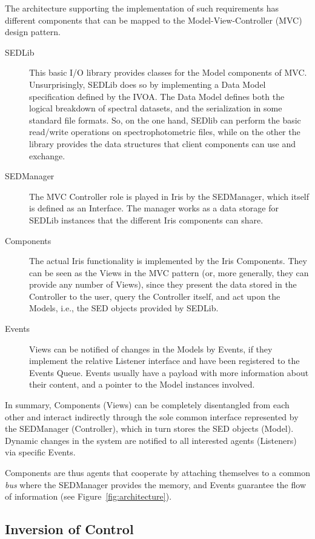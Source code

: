 \documentclass[final,5p,authoryear]{elsarticle}
\begin{document}
The architecture supporting the implementation of such requirements has
different components that can be mapped to the Model-View-Controller (MVC)
design pattern.
\begin{description}
\item[SEDLib] This basic I/O library provides
classes for the Model components of MVC. Unsurprisingly, SEDLib does so by
implementing a Data Model specification defined by the IVOA. The Data Model
defines both the logical breakdown of spectral datasets, and the serialization
in some standard file formats. So, on the one hand, SEDlib can perform the basic
read/write operations on spectrophotometric files, while on the other the library
provides the data structures that client components can use and exchange.
\item[SEDManager] The MVC Controller role is played in Iris by the SEDManager,
which itself is defined as an Interface. The manager works as a data storage for
SEDLib instances that the different Iris components can share.
\item[Components] The actual Iris functionality is implemented by the Iris
Components. They can be seen as the Views in the MVC pattern (or, more
generally, they can provide any number of Views), since they present the data
stored in the Controller to the user, query the Controller itself, and act upon
the Models, i.e., the SED objects provided by SEDLib. 
\item[Events] Views can be
notified of changes in the Models by Events, if they implement the relative
Listener interface and have been registered to the Events Queue. Events usually
have a payload with more information about their content, and a pointer to the
Model instances involved. 
\end{description}

In summary, Components (Views) can be completely disentangled from each other
and interact indirectly through the sole common interface represented by the
SEDManager (Controller), which in turn stores the SED objects (Model). Dynamic
changes in the system are notified to all interested agents (Listeners) via
specific Events.

Components are thus agents that cooperate by attaching themselves to a common
\emph{bus} where the SEDManager provides the memory, and Events guarantee the
flow of information (see Figure~\ref{fig:architecture}).

\subsection{Inversion of Control}
\end{document}
